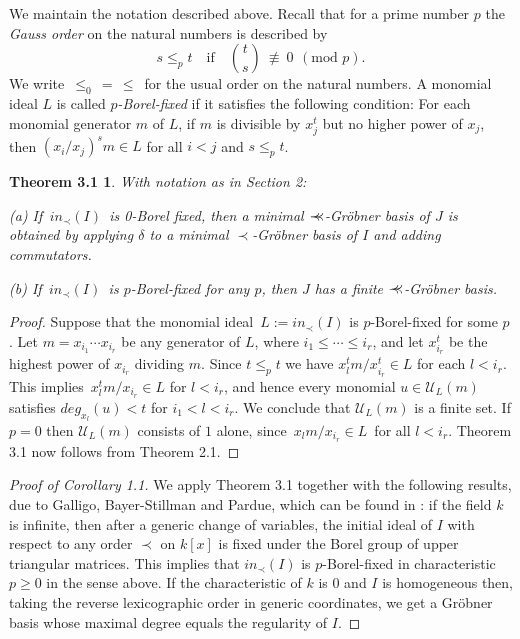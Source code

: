 \documentclass{proc-l}
\theoremstyle{plain}
\newtheorem*{theorem3}{Theorem 3.1}
\theoremstyle{definition}
\newcommand{\precc}{{\prec \kern -5pt\prec }}
\begin{document}
We maintain the notation described above. Recall
 that for 
a prime number $p$ the {\em Gauss order\/} on the natural numbers is
described by 
\begin{equation*}s\leq _{p}t \quad \text{if} \quad {\binom{t}{s}}\ \not \equiv \ 0 \ 
\, (\text{mod } p). \end{equation*}
We write $\,\leq _{0} \,= \,\leq \, $ for the usual order
on the natural numbers. A monomial 
ideal $L$ is called {\em $p$-Borel-fixed\/} if it satisfies the
following condition:
For each monomial generator $m$ of $L$,
if $m$ is divisible by $x_{j}^{t}$ but no higher power of 
$x_{j}$,
then $(x_{i}/x_{j})^{s} m\in L$ for all $i<j$ and $s\leq _{p} t$. 

\begin{theorem3} With notation as in Section 2:
\par
(a)  If $\,in_{\prec }(I)\, $ is 0-Borel fixed, then a minimal 
$\precc $-Gr\"{o}bner basis of $J$ is obtained by applying 
$\delta $ to a minimal $\prec $-Gr\"{o}bner basis of $I$
and adding commutators.

(b) If $\,in_{\prec }(I)\, $ is $p$-Borel-fixed for any $p$,
then $J$ has a finite $\precc $-Gr\"{o}bner basis.
\end{theorem3}


\begin{proof}
Suppose that the monomial ideal 
$\,L := in_{\prec }(I)$ is $p$-Borel-fixed for some $p$.
Let $m = x_{i_{1}} \cdots x_{i_{r}}$ be any generator of
$L$, where $i_{1} \leq \cdots \leq i_{r}$, and let
$x_{i_{r}}^{t}$ be the highest power of $x_{i_{r}}$ dividing $m$.
Since $t\leq _{p} t$  we have $x_{l}^{t} m/x_{i_{r}}^{t}  \in L$
for each $l<i_{r}$. This implies
$\,x_{l}^{t} m/x_{i_{r}} \in L$ for $l < i_{r}$, and
hence every monomial  $u \in {\mathcal{U}}_{L}(m)$
satisfies $deg_{x_{l}} (u) < t$ for $i_{1} < l < i_{r}$.
We conclude that ${\mathcal{U}}_{L}(m)$ is a finite set.
If $p=0$ then   ${\mathcal{U}}_{L}(m)$ consists of $1$ alone,
since $\,x_{l} m/x_{i_{r}}  \in L \,$ for all $l < i_{r} $.
Theorem 3.1 now follows from Theorem 2.1.
\end{proof}


\begin{proof}[Proof of Corollary 1.1]
We apply Theorem 3.1 together with
the following results, due to Galligo, Bayer-Stillman and Pardue, 
which can be found in \cite[Section 15.9]{Ei}:
if the field $k$ is infinite, then after
a generic change of variables, the initial ideal of $I$ with 
respect to any order $\prec $ on $k[x]$ is fixed under the
Borel group of upper triangular matrices.
This implies that $in_{\prec }(I)$ is $p$-Borel-fixed in characteristic $p\geq 0$
in the sense above. If the characteristic of $k$ is $0$ and $I$ is homogeneous
then, taking the reverse lexicographic
order in generic coordinates, we get a Gr\"{o}bner basis whose
maximal degree equals the regularity of $I$.  \end{proof}
\end{document}
